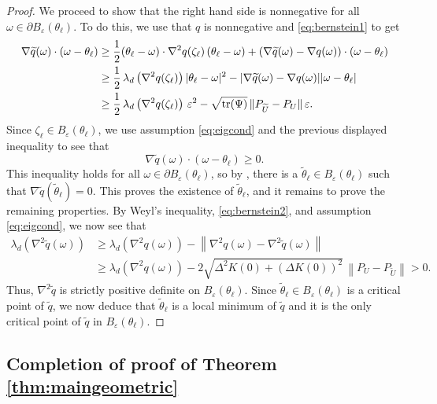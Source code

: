\documentclass[11pt]{article}
\theoremstyle{definition}
\numberwithin{theorem}{section}
\numberwithin{lemma}{section}
\numberwithin{equation}{section}
\renewcommand{\tilde}{\widetilde}
\renewcommand{\epsilon}{\varepsilon}
\def\trace{{\rm tr}}
\newcommand{\norm}[1]{{\left\|#1\right\|}}
\numberwithin{equation}{section}
\begin{document}
\begin{proof}
		We proceed to show that the right hand side is nonnegative for all $\omega\in\partial B_\epsilon(\theta_\ell)$. To do this, we use that $q$ is nonnegative and \eqref{eq:bernstein1} to get
		\begin{align*}
			\nabla \tilde q(\omega) \cdot (\omega-\theta_\ell) 
			&\geq \frac 12 (\theta_\ell-\omega) \cdot \nabla^2 q(\zeta_\ell) \, (\theta_\ell-\omega) + (\nabla \tilde q(\omega)-\nabla q(\omega)) \cdot (\omega-\theta_\ell) \\
			&\geq \frac 12 \, \lambda_d \left(\nabla^2 q(\zeta_\ell)\right) |\theta_\ell-\omega|^2 - |\nabla \tilde q(\omega)-\nabla q(\omega)| |\omega-\theta_\ell| \\
			&\geq \frac 12 \, \lambda_d\left(\nabla^2 q(\zeta_\ell)\right) \, \epsilon^2 - \sqrt{\trace(\Psi)} \, \|P_{\tilde U} -P_U\| \, \epsilon. 
		\end{align*}
		Since $\zeta_\ell\in B_\epsilon(\theta_\ell)$, we use  assumption \eqref{eq:eigcond} and the previous displayed inequality to see that 
		$$
		\nabla \tilde q(\omega) \cdot (\omega-\theta_\ell) \geq 0.
		$$
		This inequality holds for all $\omega\in \partial B_\epsilon(\theta_\ell)$, so by \cite[Theorem 1]{morales2002bolzano}, there is a $\tilde \theta_\ell\in B_\epsilon(\theta_\ell)$ such that $\nabla \tilde q(\tilde \theta_\ell)=0$. This proves the existence of $\tilde \theta_\ell$, and it remains to prove the remaining properties. By Weyl's inequality, \eqref{eq:bernstein2}, and assumption \eqref{eq:eigcond}, we now see that 
		\begin{align*}
			\lambda_d \left(\nabla^2 \tilde q(\omega)\right)
			&\geq \lambda_d\left(\nabla^2 q(\omega)\right)-\norm{\nabla^2 q(\omega)-\nabla^2 \tilde q(\omega)} \\
			&\geq \lambda_d\left(\nabla^2 q(\omega)\right) - 2 \sqrt{ \Delta^2 K(0) + (\Delta K(0))^2} \, \norm{P_U-P_{\tilde U}}
			>0. 
		\end{align*}
		Thus, $\nabla^2\tilde q$ is strictly positive definite on $B_\epsilon(\theta_\ell)$. Since $\tilde \theta_\ell \in B_\epsilon(\theta_\ell)$ is a critical point of $\tilde q$, we now deduce that $\tilde \theta_\ell$ is a local minimum of $\tilde q$ and it is the only critical point of $\tilde q$ in $B_\epsilon(\theta_\ell)$.  
	\end{proof}

  	\subsection{Completion of proof of Theorem \ref{thm:maingeometric}}
		\label{proof:geometric2}
	
\end{document}
